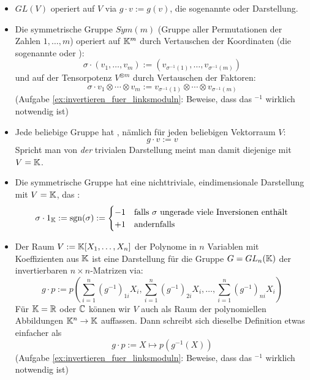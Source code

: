 \begin{example}
\begin{itemize}
\item $GL(V)$ operiert auf $V$ via $g\cdot v := g(v)$, die sogenannte  oder  Darstellung.
\item Die symmetrische Gruppe $Sym(m)$ (Gruppe aller Permutationen der Zahlen $1,\ldots,m$) operiert auf $\mathbb{K}^m$ durch Vertauschen der Koordinaten (die sogenannte  oder ):
\[\sigma \cdot (v_1,\ldots,v_m) := (v_{\sigma^{-1}(1)}, \ldots, v_{\sigma^{-1}(m)})\]
und auf der Tensorpotenz $V^{\otimes m}$ durch Vertauschen der Faktoren:
\[\sigma \cdot v_1\otimes\cdots\otimes v_m := v_{\sigma^{-1}(1)}\otimes \cdots \otimes v_{\sigma^{-1}(m)} \]
(Aufgabe \ref{ex:invertieren_fuer_linksmoduln}: Beweise, dass das $^{-1}$ wirklich notwendig ist)
\item Jede beliebige Gruppe hat , nämlich für jeden beliebigen Vektorraum $V$:
\[g\cdot v := v\]
Spricht man von \emph{der} trivialen Darstellung meint man damit diejenige mit $V=\mathbb{K}$.
\item Die symmetrische Gruppe hat eine nichttriviale, eindimensionale Darstellung mit $V=\mathbb{K}$, das :
\[\sigma \cdot 1_{\mathbb{K}} := \operatorname{sgn}(\sigma) := \begin{cases} -1 & \text{falls $\sigma$ ungerade viele Inversionen enthält} \\ +1 & \text{andernfalls}\end{cases}\]
\item Der Raum $V:=\mathbb{K}[X_1, \ldots, X_n]$ der Polynome in $n$ Variablen mit Koeffizienten aus $\mathbb{K}$ ist eine Darstellung für die Gruppe $G=GL_n(\mathbb{K})$ der invertierbaren $n\times n$-Matrizen via:
\[g\cdot p := p\left(\sum_{i=1}^n (g^{-1})_{1i} X_i, \sum_{i=1}^n (g^{-1})_{2i} X_i, \ldots, \sum_{i=1}^n (g^{-1})_{ni} X_i\right)\]
Für $\mathbb{K}=\mathbb{R}$ oder $\mathbb{C}$ können wir $V$ auch als Raum der polynomiellen Abbildungen $\mathbb{K}^n \to \mathbb{K}$ auffassen. Dann schreibt sich dieselbe Definition etwas einfacher als
\[g \cdot p := X\mapsto p(g^{-1}(X))\]
(Aufgabe \ref{ex:invertieren_fuer_linksmoduln}: Beweise, dass das $^{-1}$ wirklich notwendig ist)
\end{itemize}
\end{example}


